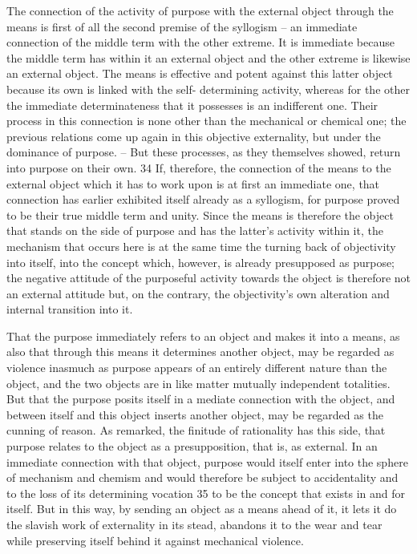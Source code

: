 The connection of the activity of purpose with the external object
through the means is first of all the second premise of the syllogism –
an immediate connection of the middle term with the other extreme. It is
immediate because the middle term has within it an external object and
the other extreme is likewise an external object. The means is effective and
potent against this latter object because its own is linked with the self-
determining activity, whereas for the other the immediate determinateness
that it possesses is an indifferent one. Their process in this connection is
none other than the mechanical or chemical one; the previous relations
come up again in this objective externality, but under the dominance of
purpose. – But these processes, as they themselves showed, return into
purpose on their own. 34 If, therefore, the connection of the means to the
external object which it has to work upon is at first an immediate one, that
connection has earlier exhibited itself already as a syllogism, for purpose
proved to be their true middle term and unity. Since the means is therefore
the object that stands on the side of purpose and has the latter's activity
within it, the mechanism that occurs here is at the same time the turning
back of objectivity into itself, into the concept which, however, is already
presupposed as purpose; the negative attitude of the purposeful activity
towards the object is therefore not an external attitude but, on the contrary,
the objectivity's own alteration and internal transition into it.

That the purpose immediately refers to an object and makes it into
a means, as also that through this means it determines another object,
may be regarded as violence inasmuch as purpose appears of an entirely
different nature than the object, and the two objects are in like matter
mutually independent totalities. But that the purpose posits itself in a
mediate connection with the object, and between itself and this object inserts
another object, may be regarded as the cunning of reason. As remarked,
the finitude of rationality has this side, that purpose relates to the object
as a presupposition, that is, as external. In an immediate connection with
that object, purpose would itself enter into the sphere of mechanism and
chemism and would therefore be subject to accidentality and to the loss
of its determining vocation 35 to be the concept that exists in and for itself.
But in this way, by sending an object as a means ahead of it, it lets it do
the slavish work of externality in its stead, abandons it to the wear and tear
while preserving itself behind it against mechanical violence.

